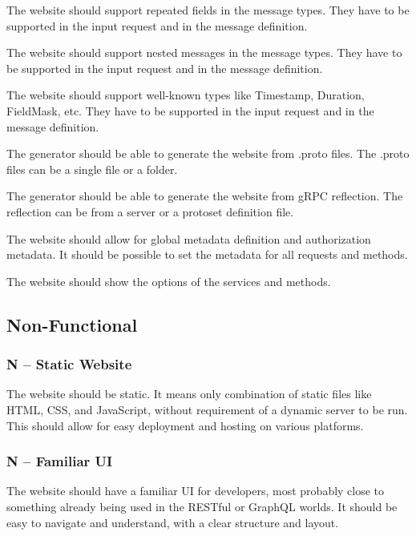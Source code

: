 The website should support repeated fields in the message types.
They have to be supported in the input request and in the message definition.

The website should support nested messages in the message types.
They have to be supported in the input request and in the message definition.

The website should support well-known types like Timestamp, Duration, FieldMask, etc.
They have to be supported in the input request and in the message definition.

The generator should be able to generate the website from .proto files.
The .proto files can be a single file or a folder.

The generator should be able to generate the website from gRPC reflection.
The reflection can be from a server or a protoset definition file.

The website should allow for global metadata definition and authorization metadata.
It should be possible to set the metadata for all requests and methods.

The website should show the options of the services and methods.

\subsection{Non-Functional}
\newcommand{\nonfunctional}[1]{%
    \subsubsection{N -- #1}%
}

\nonfunctional{Static Website}
The website should be static.
It means only combination of static files like HTML, CSS, and JavaScript, without requirement of a dynamic server to be run.
This should allow for easy deployment and hosting on various platforms.

\nonfunctional{Familiar UI}
The website should have a familiar UI for developers, most probably close to something already being used in the RESTful or GraphQL worlds.
It should be easy to navigate and understand, with a clear structure and layout.

